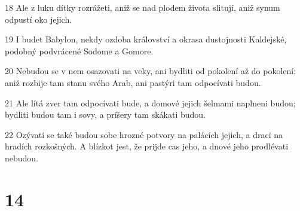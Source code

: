 \par 18 Ale z luku dítky rozrážeti, aniž se nad plodem života slitují, aniž synum odpustí oko jejich.
\par 19 I budet Babylon, nekdy ozdoba království a okrasa dustojnosti Kaldejské, podobný podvrácené Sodome a Gomore.
\par 20 Nebudou se v nem osazovati na veky, ani bydliti od pokolení až do pokolení; aniž rozbije tam stanu svého Arab, ani pastýri tam odpocívati budou.
\par 21 Ale lítá zver tam odpocívati bude, a domové jejich šelmami naplneni budou; bydliti budou tam i sovy, a príšery tam skákati budou.
\par 22 Ozývati se také budou sobe hrozné potvory na palácích jejich, a draci na hradích rozkošných. A blízkot jest, že prijde cas jeho, a dnové jeho prodlévati nebudou.

\chapter{14}

